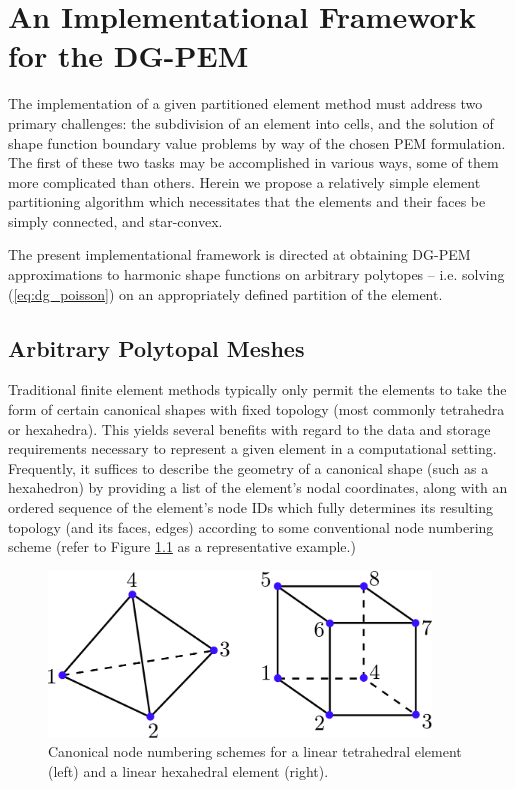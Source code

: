 \chapter{An Implementational Framework \\ for the DG-PEM} \label{ch:implementation}
%
The implementation of a given partitioned element method must address two primary challenges: the subdivision of an element into cells, and the solution of shape function boundary value problems by way of the chosen PEM formulation. The first of these two tasks may be accomplished in various ways, some of them more complicated than others. Herein we propose a relatively simple element partitioning algorithm which necessitates that the elements and their faces be simply connected, and star-convex.

The present implementational framework is directed at obtaining DG-PEM approximations to harmonic shape functions on arbitrary polytopes -- i.e. solving (\ref{eq:dg_poisson}) on an appropriately defined partition of the element.

\section{Arbitrary Polytopal Meshes}

	Traditional finite element methods typically only permit the elements to take the form of certain canonical shapes with fixed topology (most commonly tetrahedra or hexahedra). This yields several benefits with regard to the data and storage requirements necessary to represent a given element in a computational setting. Frequently, it suffices to describe the geometry of a canonical shape (such as a hexahedron) by providing a list of the element's nodal coordinates, along with an ordered sequence of the element's node IDs which fully determines its resulting topology (and its faces, edges) according to some conventional node numbering scheme (refer to Figure \ref{fig:canonical_orderings} as a representative example.)
	\begin{figure} [!ht]
		\centering
		\includegraphics[width = 4.0in]{figures/canonical_orderings.pdf}
		\caption{Canonical node numbering schemes for a linear tetrahedral element (left) and a linear hexahedral element (right).}
		\label{fig:canonical_orderings}
	\end{figure}
	
